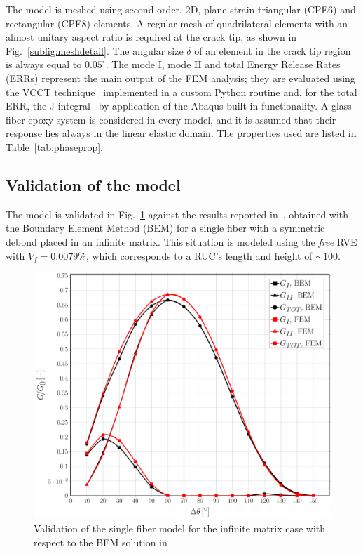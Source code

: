 \documentclass[review]{elsarticle}
\begin{document}
The model is meshed using second order, 2D, plane strain triangular (CPE6) and rectangular (CPE8) elements. A regular mesh of quadrilateral elements with an almost unitary aspect ratio is required at the crack tip, as shown in Fig.~\ref{subfig:meshdetail}. The angular size $\delta$ of an element in the crack tip region is always equal to $0.05^{\circ}$. The mode I, mode II and total Energy Release Rates (ERRs) represent the main output of the FEM analysis; they are evaluated using the VCCT technique~\cite{Krueger2004} implemented in a custom Python routine and, for the total ERR, the J-integral~\cite{Rice1968} by application of the Abaqus built-in functionality. A glass fiber-epoxy system is considered in every model, and it is assumed that their response lies always in the linear elastic domain. The properties used are listed in Table~\ref{tab:phaseprop}.

\subsection{Validation of the model}

The model is validated in Fig.~\ref{fig:validation} against the results reported in~\cite{Sandino2016}, obtained with the Boundary Element Method (BEM) for a single fiber with a symmetric debond placed in an infinite matrix. This situation is modeled using the \textit{free} RVE with $V_{f}=0.0079\%$, which corresponds to a RUC's length and height of $\sim 100$.

\begin{figure}[!h]
\centering
\includegraphics[width=\textwidth]{validation-VCCT.pdf}
\caption{Validation of the single fiber model for the infinite matrix case with respect to the BEM solution in \cite{Sandino2016}.}\label{fig:validation}
\end{figure}
\end{document}
